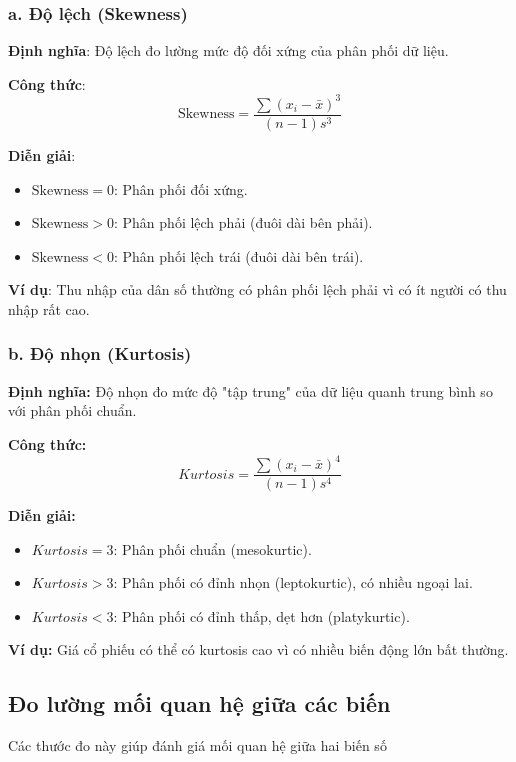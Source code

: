 \subsubsection{a. Độ lệch (Skewness)}
\textbf{Định nghĩa}: Độ lệch đo lường mức độ đối xứng của phân phối dữ liệu.

\textbf{Công thức}:
\begin{equation}
    \text{Skewness} = \frac{\sum (x_i - \bar{x})^3}{(n-1) s^3}
\end{equation}

\textbf{Diễn giải}:
\begin{itemize}
    \item $\text{Skewness} = 0$: Phân phối đối xứng.
    \item $\text{Skewness} > 0$: Phân phối lệch phải (đuôi dài bên phải).
    \item $\text{Skewness} < 0$: Phân phối lệch trái (đuôi dài bên trái).
\end{itemize}

\textbf{Ví dụ}: Thu nhập của dân số thường có phân phối lệch phải vì có ít người có thu nhập rất cao.


\subsubsection{b. Độ nhọn (Kurtosis)}

\textbf{Định nghĩa:} Độ nhọn đo mức độ "tập trung" của dữ liệu quanh trung bình so với phân phối chuẩn.

\textbf{Công thức:}
\begin{equation}
Kurtosis = \frac{\sum (x_i - \bar{x})^4}{(n-1) s^4}
\end{equation}

\textbf{Diễn giải:}
\begin{itemize}
    \item $Kurtosis = 3$: Phân phối chuẩn (mesokurtic).
    \item $Kurtosis > 3$: Phân phối có đỉnh nhọn (leptokurtic), có nhiều ngoại lai.
    \item $Kurtosis < 3$: Phân phối có đỉnh thấp, dẹt hơn (platykurtic).
\end{itemize}

\textbf{Ví dụ:} Giá cổ phiếu có thể có kurtosis cao vì có nhiều biến động lớn bất thường.




\subsection{Đo lường mối quan hệ giữa các biến}
Các thước đo này giúp đánh giá mối quan hệ giữa hai biến số
